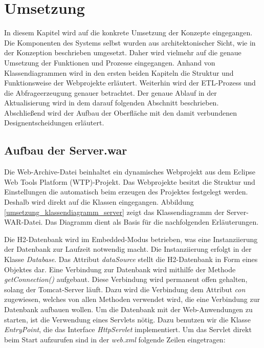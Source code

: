

\chapter{Umsetzung}
\label{ch:umsetzung}

In diesem Kapitel wird auf die konkrete Umsetzung der Konzepte eingegangen. Die Komponenten des Systems selbst wurden aus architektonischer Sicht, wie in der Konzeption beschrieben umgesetzt. Daher wird vielmehr auf die genaue Umsetzung der Funktionen und Prozesse eingegangen. Anhand von Klassendiagrammen wird in den ersten beiden Kapiteln die Struktur und Funktionsweise der Webprojekte erläutert. Weiterhin wird der ETL-Prozess und die Abfrageerzeugung genauer betrachtet. Der genaue Ablauf in der Aktualisierung wird in dem darauf folgenden Abschnitt beschrieben. Abschließend wird der Aufbau der Oberfläche mit den damit verbundenen Designentscheidungen erläutert. 

\section{Aufbau der Server.war}

Die Web-Archive-Datei beinhaltet ein dynamisches Webprojekt aus dem Eclipse Web Tools Platform (WTP)-Projekt. Das Webprojekte besitzt die Struktur und Einstellungen die automatisch beim erzeugen des Projektes festgelegt werden. Deshalb wird direkt auf die Klassen eingegangen. Abbildung \ref{umsetzung_klassendiagramm_server} zeigt das Klassendiagramm der Server-WAR-Datei. Das Diagramm dient als Basis für die nachfolgenden Erläuterungen. 

Die H2-Datenbank wird im Embedded-Modus betrieben, was eine Instanziierung der Datenbank zur Laufzeit notwendig macht. Die Instanziierung erfolgt in der Klasse \textit{Database}. Das Attribut \textit{dataSource} stellt die H2-Datenbank in Form eines Objektes dar. Eine Verbindung zur Datenbank wird mithilfe der Methode \textit{getConnection()} aufgebaut. Diese Verbindung wird permanent offen gehalten, solang der Tomcat-Server läuft. Dazu wird die Verbindung dem Attribut \textit{con} zugewiesen, welches von allen Methoden verwendet wird, die eine Verbindung zur Datenbank aufbauen wollen. Um die Datenbank mit der Web-Anwendungen zu starten, ist die Verwendung eines Servlets nötig. Dazu benutzen wir die Klasse \textit{EntryPoint}, die das Interface \textit{HttpServlet} implementiert. Um das Servlet direkt beim Start aufzurufen sind in der \textit{web.xml} folgende Zeilen eingetragen: 

